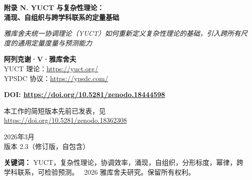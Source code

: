\documentclass[11pt]{article}
\theoremstyle{remark}
\newcommand{\Keff}{K_{\mathrm{eff}}}
\begin{document}
	
	\begin{titlepage}
		\centering
		\vspace*{0cm}
		{\Huge\textbf{附录 N. YUCT 与复杂性理论：\\ 涌现、自组织与跨学科联系的定量基础}\par}
		\vspace{1.2cm}
		{\small\textit{雅库舍夫统一协调理论（YUCT）如何重新定义复杂性理论的基础，引入跨所有尺度的通用定量度量与预测能力}}\par
		\vspace{1.2cm}
		{\small\textbf{阿列克谢·V·雅库舍夫} \\}
		YUCT 理论：\url{https://yuct.org/}\\
		YPSDC 协议：\url{https://ypsdc.com/}\par
		\vspace{2cm}
		\textbf{DOI: \url{https://doi.org/10.5281/zenodo.18444598}}\par
		\vspace{1cm}
		本工作的简短版本先前已发表，见\\ \url{https://doi.org/10.5281/zenodo.18362308}\par
		\vspace{1cm}
		2026年3月 \\ 版本 2.3（修订版，自包含）\par
		\newpage
		\begin{abstract}
			\noindent
			本附录系统阐述了雅库舍夫统一协调理论（YUCT）如何将复杂性理论从一组定性概念（涌现、自组织、幂律）转变为一门定量的、具有预测能力的科学。核心要素：(i) 协调效率 \(\Keff\) 作为系统组织的通用度量，具有统一的可操作定义；(ii) 基本误差标度律 \(\varepsilon = \kappa_c \alpha \Keff^{-\beta}\)，指数 \(\beta = 0.67\)（源自附录 L，在此总结），解释了跨领域幂律的起源；(iii) YPSDC 协议，通过分离字典与索引揭示了自组织的机制；(iv) 19 维几何，包含 120 个扇区和 7140 个耦合系数 \(\kappa_{sr}\)（附录 A），为跨学科建模提供了数学结构；(v) 对跨越 50 多个数量级的实证验证（从原子键能到宇宙微波背景涨落）的自包含总结；(vi) 在化学、生物学、经济学和意识研究中的具体可检验预测。本附录表明，新属性的出现对应于达到临界 \(\Keff\) 值，这可以在理论上进行预测。它为描述物理、生物、社会和认知系统中的复杂性提供了统一语言，并为一门新的科学学科——协调系统学——奠定了基础。
		\end{abstract}
		\vspace{0.5cm}
		\noindent
		{\small\textbf{关键词：}} YUCT，复杂性理论，协调效率，涌现，自组织，分形标度，幂律，跨学科联系，可检验预测。
		\vspace{0.2cm}
		\noindent
		\textcopyright\ 2026 雅库舍夫研究。保留所有权利。
	\end{titlepage}
	
\end{document}
